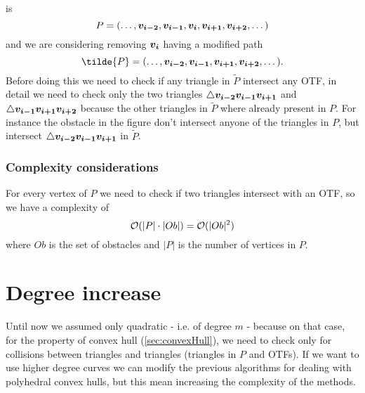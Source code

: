 \documentclass[dissertation.tex]{subfiles}
\begin{document}
is
\begin{equation*}
  P=(\dots,\boldsymbol{v_{i-2}},\boldsymbol{v_{i-1}},\boldsymbol{v_{i}},\boldsymbol{v_{i+1}},\boldsymbol{v_{i+2}},\dots)
\end{equation*}
and we are
considering removing $\boldsymbol{v_i}$ having a modified path
\begin{equation*}
  \tilde{P}=(\dots,\ve{v_{i-2}},\ve{v_{i-1}},\ve{v_{i+1}},\ve{v_{i+2}},\dots).
\end{equation*}
Before doing this we need to check if any triangle in $\tilde{P}$
intersect any \ac{OTF}, in detail we need to check only the two
triangles $\triangle\boldsymbol{v_{i-2}}\boldsymbol{v_{i-1}}\boldsymbol{v_{i+1}}$ and
$\triangle\boldsymbol{v_{i-1}}\boldsymbol{v_{i+1}}\boldsymbol{v_{i+2}}$ because the other
triangles in $\tilde{P}$ where already present in $P$. For instance
the obstacle in the figure don't intersect anyone of the triangles in
$P$, but intersect $\triangle\boldsymbol{v_{i-2}}\boldsymbol{v_{i-1}}\boldsymbol{v_{i+1}}$ in
$\tilde{P}$.

\subsubsection{Complexity considerations}
For every vertex of $P$ we need to check if two triangles intersect
with an \ac{OTF}, so we have a complexity of
\begin{equation*}
  \mathcal{O}(|P|\cdot|Ob|)=\mathcal{O}(|Ob|^2)
\end{equation*}
where $Ob$ is the set of obstacles and $|P|$ is the number of vertices
in $P$.

\section{Degree increase}\label{sec:degreeInc}
Until now we assumed only quadratic \bss - i.e. of degree $m$ - because
on that case,
for the property of convex hull (\cref{sec:convexHull}),
we need to check only for collisions between triangles and triangles
(triangles in $P$ and \acp{OTF}). If we want to use higher degree
curves we can modify the
previous algorithms for dealing with polyhedral convex hulls, but this
mean increasing the complexity of the methods.
\end{document}
